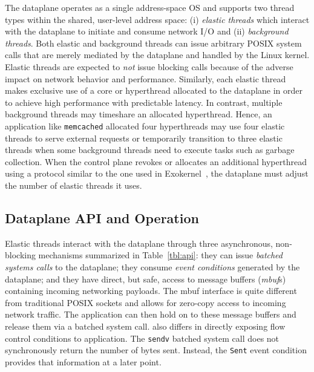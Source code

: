 The \ix dataplane operates as a single address-space OS and supports
two thread types within the shared, user-level address space: (i)
\emph{elastic threads} which interact with the \ix dataplane to
initiate and consume network I/O and (ii) \emph{background threads}.
Both elastic and background threads can issue arbitrary POSIX system
calls that are merely mediated by the dataplane and handled
by the Linux kernel.  Elastic threads are expected to \emph{not} issue
blocking calls because of the adverse impact on network behavior and
performance. Similarly, each elastic thread makes exclusive use of a
core or hyperthread allocated to the dataplane in order to achieve
high performance with predictable latency. In contrast, multiple
background threads may timeshare an allocated hyperthread. Hence, an
application like \texttt{memcached} allocated four hyperthreads may
use four elastic threads to serve external requests or temporarily
transition to three elastic threads when some background threads need
to execute tasks such as garbage collection. When the control plane
revokes or allocates an additional hyperthread using a protocol
similar to the one used in Exokernel~\cite{DBLP:conf/sosp/EnglerKO95},
the dataplane must adjust the number of elastic threads it uses.


\subsection{Dataplane API and Operation}
\label{sec:impl:kernel}

Elastic threads interact with the \ix dataplane through three
asynchronous, non-blocking mechanisms summarized in
Table~\ref{tbl:api}: they can issue \emph{batched systems calls} to
the dataplane; they consume \emph{event conditions} generated by the
dataplane; and they have direct, but safe, access to message buffers
(\emph{mbuf}s) containing incoming networking payloads. The mbuf
interface is
quite different from traditional POSIX sockets and allows for
zero-copy access to incoming network traffic.  The application can
then hold on to these message buffers and release them via a batched
system call.  \ix also differs in directly exposing flow control
conditions to application. The \texttt{sendv} batched system call does
not synchronously return the number of bytes sent. Instead, the
\texttt{Sent} event condition provides that information at a later point.

